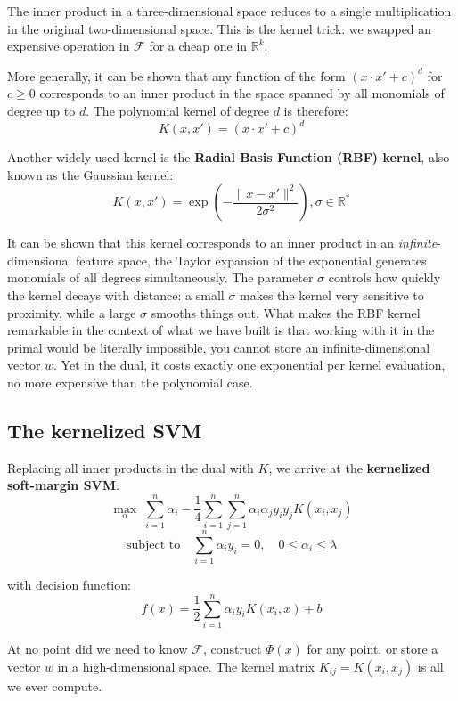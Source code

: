 \documentclass[12pt,a4paper]{article}
\begin{document}
The inner product in a three-dimensional space reduces to a single
multiplication in the original two-dimensional space. This is the kernel
trick: we swapped an expensive operation in $\mathcal{F}$ for a cheap one
in $\mathbb{R}^k$.

More generally, it can be shown that any function of the form
$(x \cdot x' + c)^d$ for $c \geq 0$ corresponds to an inner product in
the space spanned by all monomials of degree up to $d$. The polynomial
kernel of degree $d$ is therefore:
\[
K(x, x') = (x \cdot x' + c)^d
\]

Another widely used kernel is the \textbf{Radial Basis Function (RBF) kernel},
also known as the Gaussian kernel:
\[
K(x, x') = \exp\!\left(-\frac{\|x - x'\|^2}{2\sigma^2}\right), \sigma \in \mathbb{R}^*
\]

It can be shown that this kernel corresponds to an inner product in an
\emph{infinite}-dimensional feature space, the Taylor expansion of the
exponential generates monomials of all degrees simultaneously. The parameter
$\sigma$ controls how quickly the kernel decays with distance: a small
$\sigma$ makes the kernel very sensitive to proximity, while a large $\sigma$
smooths things out. What makes the RBF kernel remarkable in the context of
what we have built is that working with it in the primal would be literally
impossible, you cannot store an infinite-dimensional vector $w$. Yet in
the dual, it costs exactly one exponential per kernel evaluation, no more
expensive than the polynomial case.

\newpage

\subsection{The kernelized SVM}

Replacing all inner products in the dual with $K$, we arrive at the
\textbf{kernelized soft-margin SVM}:
\[
\max_{\alpha}\;
\sum_{i=1}^n \alpha_i
- \frac{1}{4}
\sum_{i=1}^n \sum_{j=1}^n
\alpha_i \alpha_j y_i y_j K(x_i, x_j)
\]
\[
\text{subject to} \quad
\sum_{i=1}^n \alpha_i y_i = 0,
\quad
0 \leq \alpha_i \leq \lambda
\]

with decision function:
\[
f(x) = \frac{1}{2}\sum_{i=1}^n \alpha_i y_i K(x_i, x) + b
\]

At no point did we need to know $\mathcal{F}$, construct $\Phi(x)$ for
any point, or store a vector $w$ in a high-dimensional space. The kernel
matrix $K_{ij} = K(x_i, x_j)$ is all we ever compute.
\end{document}
